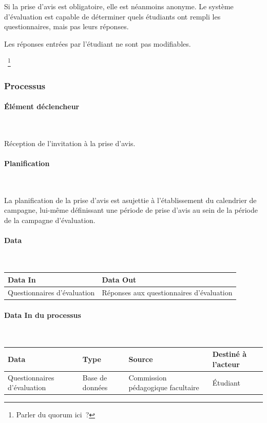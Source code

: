 \documentclass[a4paper,11pt]{report}
\begin{document}
Si la prise d'avis est obligatoire, elle est néanmoins anonyme. Le système d'évaluation est capable de déterminer quels étudiants ont rempli les questionnaires, mais pas leurs réponses.

Les réponses entrées par l'étudiant ne sont pas modifiables.

~\footnote{Parler du quorum ici~?}

\subsubsection{Processus}
\paragraph{Élément déclencheur}~\newline{}

Réception de l'invitation à la prise d'avis.

\paragraph{Planification}~\newline{}

La planification de la prise d'avis est asujettie à l'établissement du calendrier de campagne, lui-même définissant une période de prise d'avis au sein de la période de la campagne d'évaluation.

\paragraph{Data}~\newline{}

\begin{tabularx}{\linewidth}{|X|X|} \hline
Data In & Data Out \\ \hline
Questionnaires d'évaluation & Réponses aux questionnaires d'évaluation\\ \hline
\end{tabularx}

\paragraph{Data In du processus}~\newline{}

\begin{tabularx}{\linewidth}{|X|X|X|X|} \hline
Data & Type & Source & Destiné à l'acteur \\ \hline
Questionnaires d'évaluation & Base de données & Commission pédagogique facultaire & Étudiant \\ \hline
\end{tabularx}
\end{document}
